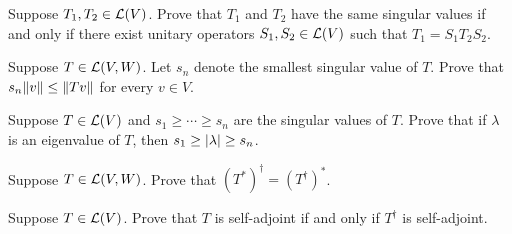 \begin{exc}
\begin{exercise}
Suppose $T_1,T_2\in\mathcal{L}(V)$. Prove that $T_1$ and $T_2$ have the same singular
values if and only if there exist unitary operators $S_1,S_2\in\mathcal{L}(V)$ such
that $T_1=S_1T_2S_2$.
\end{exercise}

\begin{exercise}
Suppose $T\in\mathcal{L}(V,W)$. Let $s_n$ denote the smallest singular value of $T$.
Prove that $s_n\lVert v \rVert\le\lVert Tv \rVert$ for every $v\in V$.
\end{exercise}

\begin{exercise}
Suppose $T\in\mathcal{L}(V)$ and $s_1\ge\cdots\ge s_n$ are the singular values of $T$.
Prove that if $\lambda$ is an eigenvalue of $T$, then
$s_1\ge\lvert \lambda \rvert\ge s_n$.
\end{exercise}

\begin{exercise}
Suppose $T\in\mathcal{L}(V,W)$. Prove that $(T^*)^\dagger=(T^\dagger)^*$.
\end{exercise}

\begin{exercise}
Suppose $T\in\mathcal{L}(V)$. Prove that $T$ is self-adjoint if and only if
$T^\dagger$ is self-adjoint.
\end{exercise}
\end{exc}


